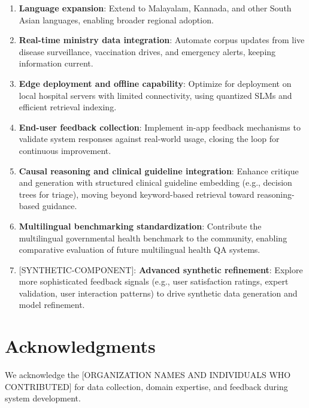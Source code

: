 \documentclass[11pt,a4paper]{article}
\newcommand{\synthetic}[1]{{\colorbox{syntheticcolor}{[SYNTHETIC-COMPONENT]: #1}}}
\begin{document}
\begin{enumerate}
    \item \textbf{Language expansion}: Extend to Malayalam, Kannada, and other South Asian languages, enabling broader regional adoption.
    
    \item \textbf{Real-time ministry data integration}: Automate corpus updates from live disease surveillance, vaccination drives, and emergency alerts, keeping information current.
    
    \item \textbf{Edge deployment and offline capability}: Optimize for deployment on local hospital servers with limited connectivity, using quantized SLMs and efficient retrieval indexing.
    
    \item \textbf{End-user feedback collection}: Implement in-app feedback mechanisms to validate system responses against real-world usage, closing the loop for continuous improvement.
    
    \item \textbf{Causal reasoning and clinical guideline integration}: Enhance critique and generation with structured clinical guideline embedding (e.g., decision trees for triage), moving beyond keyword-based retrieval toward reasoning-based guidance.
    
    \item \textbf{Multilingual benchmarking standardization}: Contribute the multilingual governmental health benchmark to the community, enabling comparative evaluation of future multilingual health QA systems.
    
    \item \synthetic{
        \textbf{Advanced synthetic refinement}: Explore more sophisticated feedback signals (e.g., user satisfaction ratings, expert validation, user interaction patterns) to drive synthetic data generation and model refinement.
    }
\end{enumerate}

\section*{Acknowledgments}

We acknowledge the [ORGANIZATION NAMES AND INDIVIDUALS WHO CONTRIBUTED] for data collection, domain expertise, and feedback during system development.
\end{document}
